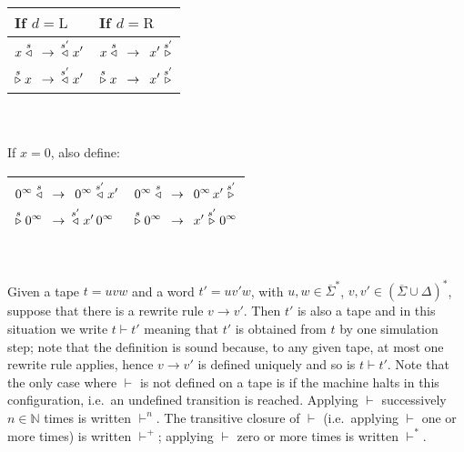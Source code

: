 \begin{table}[h!]
    \centering
    \begin{tabular}{l|l}
        If $d = \text{L}$                               & If $d = \text{R}$ \\
        \hline
        $\begin{aligned}[t]
                 x \stackrel{s}\triangleleft\,\,\, & \to \,\,\, \stackrel{s'}\triangleleft x' \\
                 \stackrel{s}\triangleright x\,\,\, & \to \,\,\, \stackrel{s'}\triangleleft x'
             \end{aligned}$ & $\begin{aligned}[t]
                                   x \stackrel{s}\triangleleft\,\,\, & \to \,\,\, x' \stackrel{s'}\triangleright \\
                                   \stackrel{s}\triangleright x\,\,\, & \to \,\,\, x' \stackrel{s'}\triangleright
                               \end{aligned}$     \\
        \hline
    \end{tabular}\\
    \ \\ If $x=0$, also define: \\
    \begin{tabular}{l|l}
        \hline
        $\begin{aligned}[t]
                 0^\infty \stackrel{s}\triangleleft\,\,\, & \to \,\,\, 0^\infty \stackrel{s'}\triangleleft x'   \\
                 \stackrel{s}\triangleright 0^\infty\,\,\, & \to \,\,\, \stackrel{s'}\triangleleft x'\, 0^\infty
             \end{aligned}$ & $\begin{aligned}[t]
                                   0^\infty \stackrel{s}\triangleleft\,\,\, & \to \,\,\, 0^\infty \, x' \stackrel{s'}\triangleright \\
                                   \stackrel{s}\triangleright 0^\infty\,\,\, & \to \,\,\, x' \stackrel{s'}\triangleright 0^\infty
                               \end{aligned}$ \\
        \hline
    \end{tabular}\\
\end{table}

Given a tape $t=uvw$ and a word $t'=uv'w$, with $u,w\in \overline{\Sigma}^*$, $v,v' \in ( \overline \Sigma \cup \Delta)^*$, suppose that there is a rewrite rule $v \to v'$. Then $t'$ is also a tape and in this situation we write $t \vdash t'$ meaning that $t'$ is obtained from $t$ by one simulation step; note that the definition is sound because, to any given tape, at most one rewrite rule applies, hence $v \to v'$ is defined uniquely and so is $t \vdash t'$. Note that the only case where $\vdash$ is not defined on a tape is if the machine halts in this configuration, i.e.\ an undefined transition is reached. Applying $\vdash$ successively $n\in\mathbb{N}$ times is written $\vdash^n$. The transitive closure of $\vdash$ (i.e.\ applying $\vdash$ one or more times) is written $\vdash^+$; applying $\vdash$ zero or more times is written $\vdash^*$.

